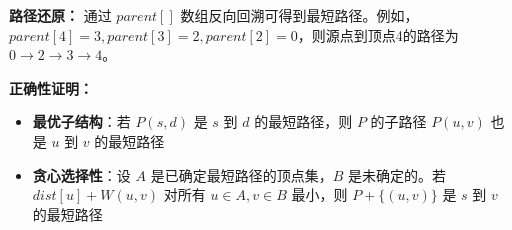 \textbf{路径还原：} 通过 $parent[]$ 数组反向回溯可得到最短路径。例如，$parent[4]=3, parent[3]=2, parent[2]=0$，则源点到顶点4的路径为 $0 \to 2 \to 3 \to 4$。

\textbf{正确性证明：}
\begin{itemize}
    \item \textbf{最优子结构}：若 $P(s, d)$ 是 $s$ 到 $d$ 的最短路径，则 $P$ 的子路径 $P(u, v)$ 也是 $u$ 到 $v$ 的最短路径
    \item \textbf{贪心选择性}：设 $A$ 是已确定最短路径的顶点集，$B$ 是未确定的。若 $dist[u] + W(u, v)$ 对所有 $u \in A, v \in B$ 最小，则 $P + \{(u, v)\}$ 是 $s$ 到 $v$ 的最短路径
\end{itemize}
